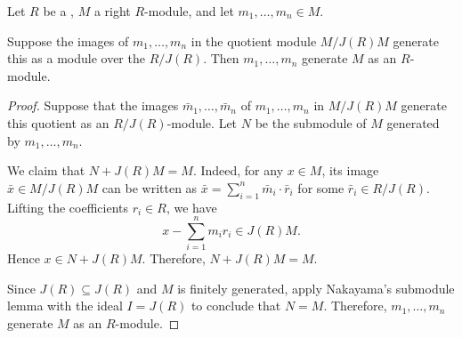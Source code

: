 \begin{proposition}  \label{proposition:nakayamas_generator_criterion_for_finitely_generated_modules_over_a_ring}
	Let $R$ be a , $M$ a  right $R$-module, and let $m_1, \ldots, m_n \in M$.

	Suppose the images of $m_1, \ldots, m_n$ in the quotient module $M/J(R)M$ generate this  as a module over the  $R/J(R)$. Then $m_1, \ldots, m_n$ generate $M$ as an $R$-module.
\end{proposition}
\begin{proof}
	Suppose that the images $\bar{m}_1, \ldots, \bar{m}_n$ of $m_1, \ldots, m_n$ in $M/J(R)M$ generate this quotient as an $R/J(R)$-module. Let $N$ be the submodule of $M$ generated by $m_1, \ldots, m_n$.

	We claim that $N + J(R)M = M$. Indeed, for any $x \in M$, its image $\bar{x} \in M/J(R)M$ can be written as $\bar{x} = \sum_{i=1}^n \bar{m}_i \cdot \bar{r}_i$ for some $\bar{r}_i \in R/J(R)$. Lifting the coefficients $r_i \in R$, we have
	$$x - \sum_{i=1}^n m_i r_i \in J(R)M.$$
	Hence $x \in N + J(R)M$. Therefore, $N + J(R)M = M$.

	Since $J(R) \subseteq J(R)$ and $M$ is finitely generated, apply Nakayama's submodule lemma with the ideal $I = J(R)$ to conclude that $N = M$. Therefore, $m_1, \ldots, m_n$ generate $M$ as an $R$-module.
\end{proof}

